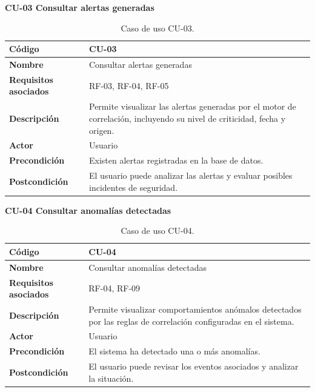 \textbf{\large CU-03 Consultar alertas generadas}
\vspace{0.1cm}
\begin{table}[H]
	\centering
	\begin{tabular}{|p{4cm}|p{9cm}|}
		\hline
		\textbf{Código} & CU-03 \\
		\hline
		\textbf{Nombre} & Consultar alertas generadas \\
		\hline
		\textbf{Requisitos asociados} & RF-03, RF-04, RF-05 \\
		\hline
		\textbf{Descripción} & Permite visualizar las alertas generadas por el motor de correlación, incluyendo su nivel de criticidad, fecha y origen. \\
		\hline
		\textbf{Actor} & Usuario \\
		\hline
		\textbf{Precondición} & Existen alertas registradas en la base de datos. \\
		\hline
		\textbf{Postcondición} & El usuario puede analizar las alertas y evaluar posibles incidentes de seguridad. \\
		\hline
	\end{tabular}
	\caption{Caso de uso CU-03.}
\end{table}

\textbf{\large CU-04 Consultar anomalías detectadas}
\vspace{0.1cm}
\begin{table}[H]
	\centering
	\begin{tabular}{|p{4cm}|p{9cm}|}
		\hline
		\textbf{Código} & CU-04 \\
		\hline
		\textbf{Nombre} & Consultar anomalías detectadas \\
		\hline
		\textbf{Requisitos asociados} & RF-04, RF-09 \\
		\hline
		\textbf{Descripción} & Permite visualizar comportamientos anómalos detectados por las reglas de correlación configuradas en el sistema. \\
		\hline
		\textbf{Actor} & Usuario \\
		\hline
		\textbf{Precondición} & El sistema ha detectado una o más anomalías. \\
		\hline
		\textbf{Postcondición} & El usuario puede revisar los eventos asociados y analizar la situación. \\
		\hline
	\end{tabular}
	\caption{Caso de uso CU-04.}
\end{table}

